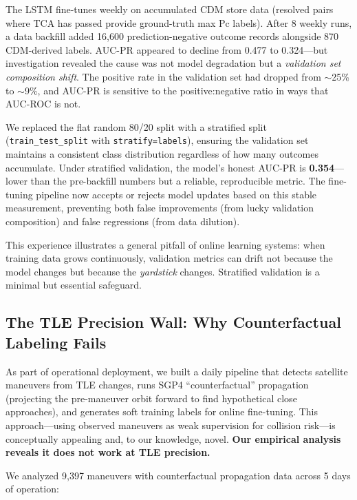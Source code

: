 \documentclass{article}
\begin{document}
The LSTM fine-tunes weekly on accumulated CDM store data (resolved pairs where TCA has passed provide ground-truth max Pc labels). After 8 weekly runs, a data backfill added 16,600 prediction-negative outcome records alongside 870 CDM-derived labels. AUC-PR appeared to decline from 0.477 to 0.324---but investigation revealed the cause was not model degradation but a \emph{validation set composition shift}. The positive rate in the validation set had dropped from $\sim$25\% to $\sim$9\%, and AUC-PR is sensitive to the positive:negative ratio in ways that AUC-ROC is not.

We replaced the flat random 80/20 split with a stratified split (\texttt{train\_test\_split} with \texttt{stratify=labels}), ensuring the validation set maintains a consistent class distribution regardless of how many outcomes accumulate. Under stratified validation, the model's honest AUC-PR is \textbf{0.354}---lower than the pre-backfill numbers but a reliable, reproducible metric. The fine-tuning pipeline now accepts or rejects model updates based on this stable measurement, preventing both false improvements (from lucky validation composition) and false regressions (from data dilution).

This experience illustrates a general pitfall of online learning systems: when training data grows continuously, validation metrics can drift not because the model changes but because the \emph{yardstick} changes. Stratified validation is a minimal but essential safeguard.

\subsection{The TLE Precision Wall: Why Counterfactual Labeling Fails}
\label{sec:tle-wall}

As part of operational deployment, we built a daily pipeline that detects satellite maneuvers from TLE changes, runs SGP4 ``counterfactual'' propagation (projecting the pre-maneuver orbit forward to find hypothetical close approaches), and generates soft training labels for online fine-tuning. This approach---using observed maneuvers as weak supervision for collision risk---is conceptually appealing and, to our knowledge, novel. \textbf{Our empirical analysis reveals it does not work at TLE precision.}

We analyzed 9,397 maneuvers with counterfactual propagation data across 5 days of operation:
\end{document}

